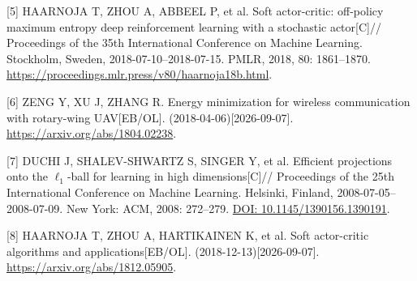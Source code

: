 \par \textnormal{[5]} 
HAARNOJA T, ZHOU A, ABBEEL P, et al.
Soft actor-critic: off-policy maximum entropy deep reinforcement learning with a stochastic actor[C]//
Proceedings of the 35th International Conference on Machine Learning.
Stockholm, Sweden, 2018-07-10--2018-07-15.
PMLR, 2018, 80: 1861--1870.
\url{https://proceedings.mlr.press/v80/haarnoja18b.html}.

\par \textnormal{[6]} 
ZENG Y, XU J, ZHANG R.
Energy minimization for wireless communication with rotary-wing UAV[EB/OL].
(2018-04-06)[2026-09-07].
\url{https://arxiv.org/abs/1804.02238}.

\par \textnormal{[7]} 
DUCHI J, SHALEV-SHWARTZ S, SINGER Y, et al.
Efficient projections onto the $\ell_1$-ball for learning in high dimensions[C]//
Proceedings of the 25th International Conference on Machine Learning.
Helsinki, Finland, 2008-07-05--2008-07-09.
New York: ACM, 2008: 272--279.
\href{https://doi.org/10.1145/1390156.1390191}{DOI: 10.1145/1390156.1390191}.

\par \textnormal{[8]} 
HAARNOJA T, ZHOU A, HARTIKAINEN K, et al.
Soft actor-critic algorithms and applications[EB/OL].
(2018-12-13)[2026-09-07].
\url{https://arxiv.org/abs/1812.05905}.

